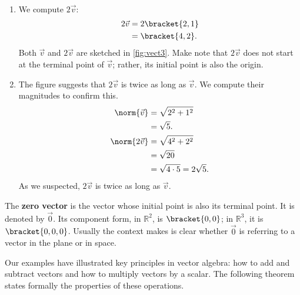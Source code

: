 {\mbox{}\\[-2\baselineskip]\begin{enumerate}
\item	We compute $2\vec v$:
	\begin{align*}
		2\vec v &= 2\bracket{2,1}\\
		&=\bracket{4,2}.
	\end{align*}
	Both $\vec v$ and $2\vec v$ are sketched in \autoref{fig:vect3}. Make note that $2\vec v$ does not start at the terminal point of $\vec v$; rather, its initial point is also the origin. 
	
\item	The figure suggests that $2\vec v$ is twice as long as $\vec v$. We compute their magnitudes to confirm this.
\begin{align*}
	\norm{\vec v} &= \sqrt{2^2+1^2}\\
	&= \sqrt{5}.\\
	\norm{2\vec v}&=\sqrt{4^2+2^2} \\
	&= \sqrt{20}\\
	&= \sqrt{4\cdot 5} = 2\sqrt{5}.
\end{align*}
As we suspected, $2\vec v$ is twice as long as $\vec v$.\eoehere
\end{enumerate}}

The \textbf{zero vector} is the vector whose initial point is also its terminal point. It is denoted by $\vec 0$. Its component form, in $\mathbb{R}^2$, is $\bracket{0,0}$; in $\mathbb{R}^3$, it is $\bracket{0,0,0}$. Usually the context makes is clear whether $\vec 0$ is referring to a vector in the plane or in space.

Our examples have illustrated key principles in vector algebra: how to add and subtract vectors and how to multiply vectors by a scalar. The following theorem states formally the properties of these operations.

